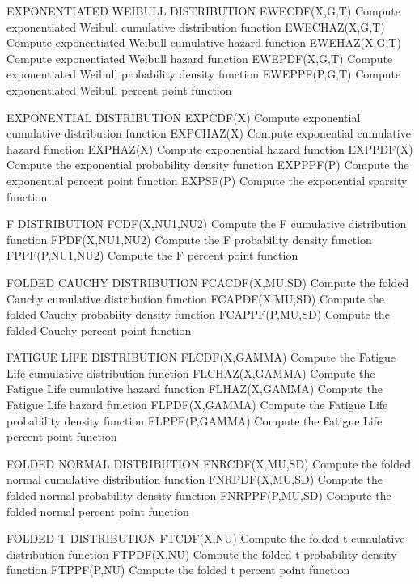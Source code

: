 EXPONENTIATED WEIBULL DISTRIBUTION
   EWECDF(X,G,T)      Compute exponentiated Weibull cumulative
                      distribution function
   EWECHAZ(X,G,T)     Compute exponentiated Weibull cumulative
                      hazard function
   EWEHAZ(X,G,T)      Compute exponentiated Weibull hazard function
   EWEPDF(X,G,T)      Compute exponentiated Weibull probability
                      density function
   EWEPPF(P,G,T)      Compute exponentiated Weibull percent point
                      function

EXPONENTIAL DISTRIBUTION
   EXPCDF(X)          Compute exponential cumulative distribution
                      function
   EXPCHAZ(X)         Compute exponential cumulative hazard
                      function
   EXPHAZ(X)          Compute exponential hazard function
   EXPPDF(X)          Compute the exponential probability density
                      function
   EXPPPF(P)          Compute the exponential percent point function
   EXPSF(P)           Compute the exponential sparsity function
 
F DISTRIBUTION
   FCDF(X,NU1,NU2)    Compute the F cumulative distribution function
   FPDF(X,NU1,NU2)    Compute the F probability density function
   FPPF(P,NU1,NU2)    Compute the F percent point function
 
FOLDED CAUCHY DISTRIBUTION
   FCACDF(X,MU,SD)    Compute the folded Cauchy cumulative
                      distribution function
   FCAPDF(X,MU,SD)    Compute the folded Cauchy probabiity density
                      function
   FCAPPF(P,MU,SD)    Compute the folded Cauchy percent point function

FATIGUE LIFE DISTRIBUTION
   FLCDF(X,GAMMA)     Compute the Fatigue Life cumulative distribution
                      function
   FLCHAZ(X,GAMMA)    Compute the Fatigue Life cumulative hazard
                      function
   FLHAZ(X,GAMMA)     Compute the Fatigue Life hazard function
   FLPDF(X,GAMMA)     Compute the Fatigue Life probability density
                      function
   FLPPF(P,GAMMA)     Compute the Fatigue Life percent point function
 
FOLDED NORMAL DISTRIBUTION
   FNRCDF(X,MU,SD)    Compute the folded normal cumulative
                      distribution function
   FNRPDF(X,MU,SD)    Compute the folded normal probability density
                      function
   FNRPPF(P,MU,SD)    Compute the folded normal percent point function

FOLDED T DISTRIBUTION
   FTCDF(X,NU)        Compute the folded t cumulative distribution
                      function
   FTPDF(X,NU)        Compute the folded t probability density
                      function
   FTPPF(P,NU)        Compute the folded t percent point function

